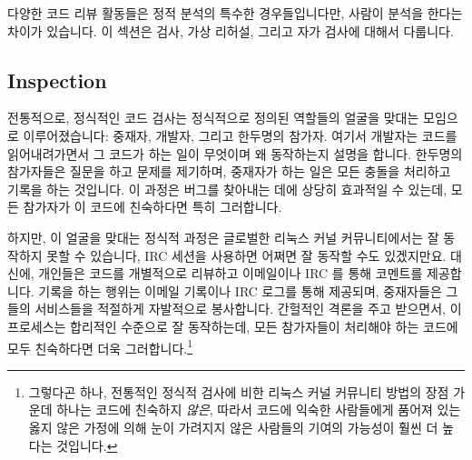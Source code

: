다양한 코드 리뷰 활동들은 정적 분석의 특수한 경우들입니다만, 사람이 분석을
한다는 차이가 있습니다.
이 섹션은 검사, 가상 리허설, 그리고 자가 검사에 대해서 다룹니다.

\subsection{Inspection}
\label{sec:debugging:Inspection}

전통적으로, 정식적인 코드 검사는 정식적으로 정의된 역할들의 얼굴을 맞대는
모임으로 이루어졌습니다: 중재자, 개발자, 그리고 한두명의 참가자.
여기서 개발자는 코드를 읽어내려가면서 그 코드가 하는 일이 무엇이며 왜
동작하는지 설명을 합니다.
한두명의 참가자들은 질문을 하고 문제를 제기하며, 중재자가 하는 일은 모든 충돌을
처리하고 기록을 하는 것입니다.
이 과정은 버그를 찾아내는 데에 상당히 효과적일 수 있는데, 모든 참가자가 이
코드에 친숙하다면 특히 그러합니다.

하지만, 이 얼굴을 맞대는 정식적 과정은 글로벌한 리눅스 커널 커뮤니티에서는 잘
동작하지 못할 수 있습니다, IRC 세션을 사용하면 어쩌면 잘 동작할 수도
있겠지만요.
대신에, 개인들은 코드를 개별적으로 리뷰하고 이메일이나 IRC 를 통해 코멘트를
제공합니다.
기록을 하는 행위는 이메일 기록이나 IRC 로그를 통해 제공되며, 중재자들은 그들의
서비스들을 적절하게 자발적으로 봉사합니다.
간헐적인 격론을 주고 받으면서, 이 프로세스는 합리적인 수준으로 잘 동작하는데,
모든 참가자들이 처리해야 하는 코드에 모두 친숙하다면 더욱 그러합니다.\footnote{
	그렇다곤 하나, 전통적인 정식적 검사에 비한 리눅스 커널 커뮤니티 방법의
	장점 가운데 하나는 코드에 친숙하지 \emph{않은}, 따라서 코드에 익숙한
	사람들에게 품어져 있는 옳지 않은 가정에 의해 눈이 가려지지 않은
	사람들의 기여의 가능성이 훨씬 더 높다는 것입니다.}
\iffalse

